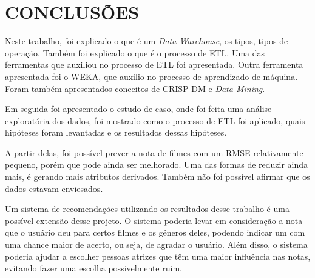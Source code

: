 \section{CONCLUSÕES}
Neste trabalho, foi explicado o que é um \textit{Data Warehouse}, os tipos, tipos de operação. Também foi explicado o que é o processo de ETL. Uma das ferramentas que auxiliou no processo de ETL \pdi foi apresentada. Outra ferramenta apresentada foi o WEKA, que auxilio no processo de aprendizado de máquina. Foram também apresentados conceitos de CRISP-DM e \textit{Data Mining}.

Em seguida foi apresentado o estudo de caso, onde foi feita uma análise exploratória dos dados, foi mostrado como o processo de ETL foi aplicado, quais hipóteses foram levantadas e os resultados dessas hipóteses. 

A partir delas, foi possível prever a nota de filmes com um RMSE relativamente pequeno, porém que pode ainda ser melhorado. Uma das formas de reduzir ainda mais, é gerando mais atributos derivados. Também não foi possível afirmar que os dados estavam enviesados.

Um sistema de recomendações utilizando os resultados desse trabalho é uma possível extensão desse projeto. O sistema poderia levar em consideração a nota que o usuário deu para certos filmes e os gêneros deles, podendo indicar um com uma chance maior de acerto, ou seja, de agradar o usuário. Além disso, o sistema poderia ajudar a escolher pessoas atrizes que têm uma maior influência nas notas, evitando fazer uma escolha possivelmente ruim.